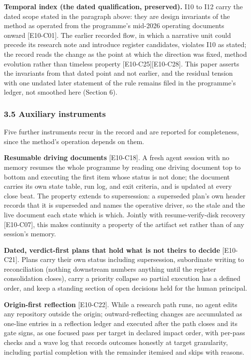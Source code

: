 \documentclass[
  11pt,
]{article}
\begin{document}
\textbf{Temporal index (the dated qualification, preserved).} I10 to I12
carry the dated scope stated in the paragraph above: they are design
invariants of the method as operated from the programme's mid-2026
operating documents onward {[}E10-C01{]}. The earlier recorded flow, in
which a narrative unit could precede its research note and introduce
register candidates, violates I10 as stated; the record reads the change
as the point at which the direction was fixed, method evolution rather
than timeless property {[}E10-C25{]}{[}E10-C28{]}. This paper asserts
the invariants from that dated point and not earlier, and the residual
tension with one undated later statement of the rule remains filed in
the programme's ledger, not smoothed here (Section 6).

\subsubsection{3.5 Auxiliary instruments}\label{auxiliary-instruments}

Five further instruments recur in the record and are reported for
completeness, since the method's operation depends on them.

\textbf{Resumable driving documents} {[}E10-C18{]}. A fresh agent
session with no memory resumes the whole programme by reading one
driving document top to bottom and executing the first item whose status
is not done; the document carries its own state table, run log, and exit
criteria, and is updated at every close beat. The property extends to
supersession: a superseded plan's own header records that it is
superseded and names the operative driver, so the stale and the live
document each state which is which. Jointly with resume-verify-disk
recovery {[}E10-C07{]}, this makes continuity a property of the artifact
set rather than of any session's memory.

\textbf{Dated, verdict-first plans that hold what is not theirs to
decide} {[}E10-C21{]}. Plans carry their own status including
supersession, subordinate writing to reconciliation (nothing downstream
numbers anything until the register consolidation closes), carry a
priority collapse so partial execution has a defined order, and keep a
standing section of open decisions held for the human principal.

\textbf{Origin-first reflection} {[}E10-C22{]}. While a research path
runs, no agent edits any repository outside the origin;
outward-reflecting changes are accumulated as one-line entries in a
reflection ledger and executed after the path closes and its gate signs,
as one focused pass per target in declared impact order, with per-pass
checks and a wave log that records outcomes honestly at target
granularity, including partial completion with the remainder itemised
and skips with reasons.
\end{document}
